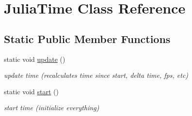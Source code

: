 \hypertarget{classJuliaTime}{}\section{Julia\+Time Class Reference}
\label{classJuliaTime}
\subsection*{Static Public Member Functions}
\begin{DoxyCompactItemize}
\item 
\mbox{\label{classJuliaTime_a0de18abd49917adc503f1065aa1e47b4}} 
static void \hyperlink{classJuliaTime_a0de18abd49917adc503f1065aa1e47b4}{update} ()
\begin{DoxyCompactList}\small\item\em update time (recalculates time since start, delta time, fps, etc) \end{DoxyCompactList}\item 
\mbox{\label{classJuliaTime_ae466da8414d593da71a955e0bcd2b816}} 
static void \hyperlink{classJuliaTime_ae466da8414d593da71a955e0bcd2b816}{start} ()
\begin{DoxyCompactList}\small\item\em start time (initialize everything) \end{DoxyCompactList}\end{DoxyCompactItemize}
